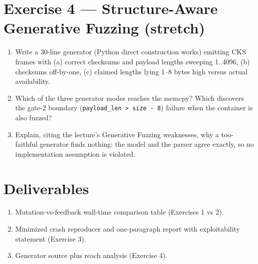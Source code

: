 \documentclass[12pt]{Training}
\begin{document}
\section*{Exercise 4 --- Structure-Aware Generative Fuzzing (stretch)}
\begin{enumerate}
    \item Write a 30-line generator (Python direct construction works) emitting CKS frames with (a) correct checksums and payload lengths sweeping 1..4096, (b) checksums off-by-one, (c) claimed lengths lying 1--8 bytes high versus actual availability.
    \item Which of the three generator modes reaches the memcpy? Which discovers the gate-2 boundary (\lstinline{payload_len > size - 8}) failure when the container is also fuzzed?
    \item Explain, citing the lecture's Generative Fuzzing weaknesses, why a too-faithful generator finds nothing: the model and the parser agree exactly, so no implementation assumption is violated.
\end{enumerate}

\section*{Deliverables}
\begin{enumerate}
    \item Mutation-vs-feedback wall-time comparison table (Exercises 1 vs 2).
    \item Minimized crash reproducer and one-paragraph report with exploitability statement (Exercise 3).
    \item Generator source plus reach analysis (Exercise 4).
\end{enumerate}
\end{document}

